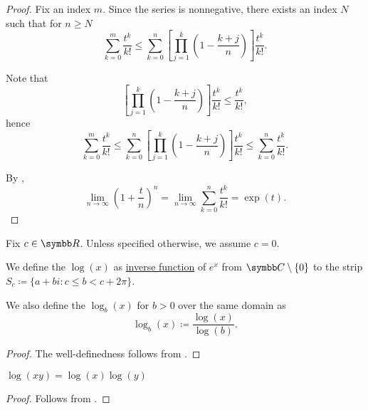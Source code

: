 \begin{proof}
  Fix an index \( m \). Since the series is nonnegative, there exists an index \( N \) such that for \( n \geq N \)
  \begin{equation*}
    \sum_{k=0}^m \frac {t^k} {k!}
    \leq
    \sum_{k=0}^n \left[ \prod_{j=1}^k \left(1 - \frac {k+j} n \right) \right] \frac {t^k} {k!}.
  \end{equation*}

  Note that
  \begin{equation*}
    \left[ \prod_{j=1}^k \left(1 - \frac {k+j} n \right) \right] \frac {t^k} {k!}
    \leq
    \frac {t^k} {k!},
  \end{equation*}
  hence
  \begin{equation*}
    \sum_{k=0}^m \frac {t^k} {k!}
    \leq
    \sum_{k=0}^n \left[ \prod_{j=1}^k \left(1 - \frac {k+j} n \right) \right] \frac {t^k} {k!}
    \leq
    \sum_{k=0}^n \frac {t^k} {k!}.
  \end{equation*}

  By ,
  \begin{equation*}
    \lim_{n \to \infty} \left(1 + \frac t n \right)^n
    =
    \lim_{n \to \infty} \sum_{k=0}^n \frac {t^k} {k!}
    =
    \exp(t).
  \end{equation*}
\end{proof}

\begin{definition}\label{def:logarithm}
  Fix \( c \in \BR \). Unless specified otherwise, we assume \( c = 0 \).

  We define the  \( \log(x) \) as \hyperref[def:function/inverse]{inverse function} of \( e^x \) from \( \BC \setminus \{ 0 \} \) to the strip \( S_c \coloneqq \{ a + bi \colon c \leq b < c + 2\pi \} \).

  We also define the  \( \log_b(x) \) for \( b > 0 \) over the same domain as
  \begin{equation*}
    \log_b(x) \coloneqq \frac {\log(x)} {\log(b)}.
  \end{equation*}
\end{definition}
\begin{proof}
  The well-definedness follows from .
\end{proof}

\begin{proposition}\label{thm:logarithm_properties}
  \mbox{}
  \begin{PropEnum}
     \( \log(xy) = \log(x) \log(y) \)
  \end{PropEnum}
\end{proposition}
\begin{proof}
   Follows from .
\end{proof}

